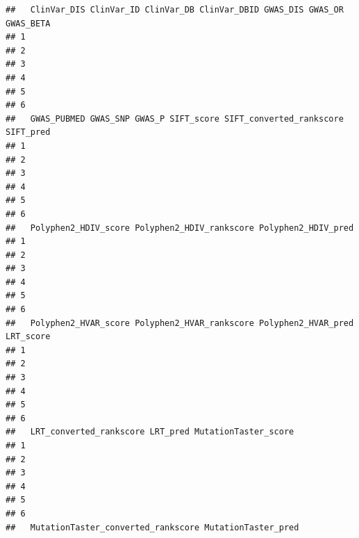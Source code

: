 \documentclass[
]{article}
\begin{document}
\begin{verbatim}
##   ClinVar_DIS ClinVar_ID ClinVar_DB ClinVar_DBID GWAS_DIS GWAS_OR GWAS_BETA
## 1                                                                          
## 2                                                                          
## 3                                                                          
## 4                                                                          
## 5                                                                          
## 6                                                                          
##   GWAS_PUBMED GWAS_SNP GWAS_P SIFT_score SIFT_converted_rankscore SIFT_pred
## 1                                                                          
## 2                                                                          
## 3                                                                          
## 4                                                                          
## 5                                                                          
## 6                                                                          
##   Polyphen2_HDIV_score Polyphen2_HDIV_rankscore Polyphen2_HDIV_pred
## 1                                                                  
## 2                                                                  
## 3                                                                  
## 4                                                                  
## 5                                                                  
## 6                                                                  
##   Polyphen2_HVAR_score Polyphen2_HVAR_rankscore Polyphen2_HVAR_pred LRT_score
## 1                                                                            
## 2                                                                            
## 3                                                                            
## 4                                                                            
## 5                                                                            
## 6                                                                            
##   LRT_converted_rankscore LRT_pred MutationTaster_score
## 1                                                      
## 2                                                      
## 3                                                      
## 4                                                      
## 5                                                      
## 6                                                      
##   MutationTaster_converted_rankscore MutationTaster_pred

\end{verbatim}
\end{document}
